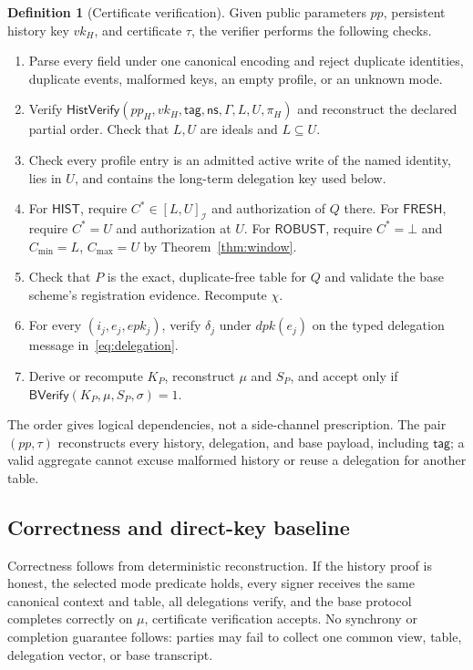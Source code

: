 \documentclass[11pt]{article}
\theoremstyle{definition}
\newtheorem{definition}[theorem]{Definition}
\newcommand{\Id}{\mathcal I}
\begin{document}
\begin{definition}[Certificate verification]
Given public parameters $pp$, persistent history key $vk_H$, and certificate $\tau$, the verifier performs the following checks.
\begin{enumerate}
  \item Parse every field under one canonical encoding and reject duplicate identities, duplicate events, malformed keys, an empty profile, or an unknown mode.
  \item Verify $\mathsf{HistVerify}(pp_H,vk_H,\mathsf{tag},\mathsf{ns},\Gamma,L,U,\pi_H)$ and reconstruct the declared partial order.  Check that $L,U$ are ideals and $L\subseteq U$.
  \item Check every profile entry is an admitted active write of the named identity, lies in $U$, and contains the long-term delegation key used below.
  \item For $\mathsf{HIST}$, require $C^*\in[L,U]_{\Id}$ and authorization of $Q$ there.  For $\mathsf{FRESH}$, require $C^*=U$ and authorization at $U$.  For $\mathsf{ROBUST}$, require $C^*=\bot$ and $C_{\min}=L$, $C_{\max}=U$ by Theorem~\ref{thm:window}.
  \item Check that $P$ is the exact, duplicate-free table for $Q$ and validate the base scheme's registration evidence.  Recompute $\chi$.
  \item For every $(i_j,e_j,epk_j)$, verify $\delta_j$ under $dpk(e_j)$ on the typed delegation message in~\eqref{eq:delegation}.
  \item Derive or recompute $K_P$, reconstruct $\mu$ and $S_P$, and accept only if $\mathsf{BVerify}(K_P,\mu,S_P,\sigma)=1$.
\end{enumerate}
\end{definition}
The order gives logical dependencies, not a side-channel prescription.  The pair $(pp,\tau)$ reconstructs every history, delegation, and base payload, including $\mathsf{tag}$; a valid aggregate cannot excuse malformed history or reuse a delegation for another table.

\subsection{Correctness and direct-key baseline}
Correctness follows from deterministic reconstruction.  If the history proof is honest, the selected mode predicate holds, every signer receives the same canonical context and table, all delegations verify, and the base protocol completes correctly on $\mu$, certificate verification accepts.  No synchrony or completion guarantee follows: parties may fail to collect one common view, table, delegation vector, or base transcript.
\end{document}

